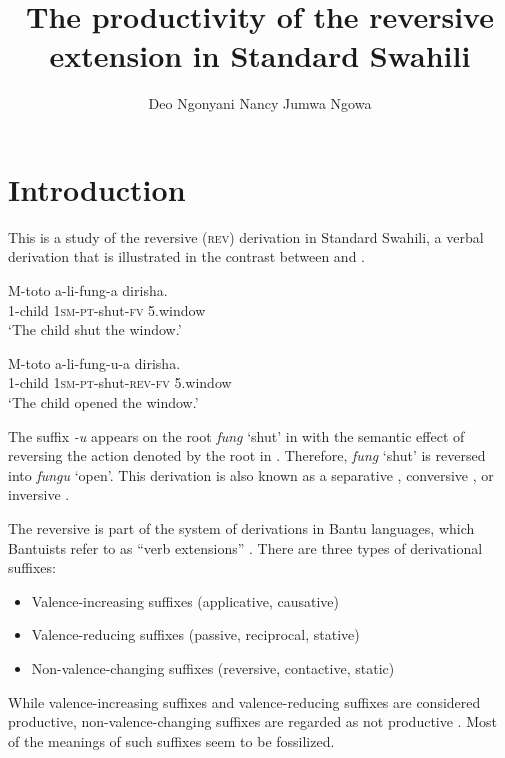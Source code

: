\documentclass[output=paper]{langsci/langscibook}
\title{The productivity of the reversive extension in Standard Swahili}
\author{%
 Deo Ngonyani\affiliation{Michigan State University}\lastand 
 Nancy Jumwa Ngowa \affiliation{Pwani University}
}
\begin{document}

\section{Introduction}\label{sec:ngonyaningowa:1}

This is a study of the reversive (\textsc{rev}) derivation in Standard Swahili, a verbal derivation that is illustrated in the contrast between  and .

\ea\label{ex:ngonyaningowa:1}
\ea\label{ex:ngonyaningowa:1a}  
\gll M-toto    a-li-fung-a    dirisha. \\
1-child    1\textsc{sm-pt}-shut-\textsc{fv}  5.window \\
\glt ‘The child shut the window.’

\ex\label{ex:ngonyaningowa:1b}
\gll M-toto    a-li-fung-u-a      dirisha. \\
1-child    1\textsc{sm-pt}-shut-\textsc{rev-fv}  5.window \\
\glt ‘The child opened the window.’
\z
\z

The suffix \textit{-u} appears on the root \textit{fung} ‘shut’ in  with the semantic effect of reversing the action denoted by the root  in . Therefore, \textit{fung} ‘shut’ is reversed into \textit{fungu} ‘open’. This derivation is also known as a separative \citep{Schadeberg2003}, conversive \citep{Ashton1947}, or inversive \citep{Doke1935}.

The reversive is part of the system of derivations in Bantu languages, which  Bantuists refer to as “verb extensions” \citep{Guthrie1962}. There are three types of derivational suffixes:

\begin{itemize}
\item Valence-increasing suffixes (applicative, causative)
\item Valence-reducing suffixes (passive, reciprocal, stative)
\item Non-valence-changing suffixes (reversive, contactive, static)
\end{itemize}

While valence-increasing suffixes and valence-reducing suffixes are considered productive, non-valence-changing suffixes are regarded as not productive \citep{Shepardson1986}. Most of the meanings of such suffixes seem to be fossilized.
\end{document}
